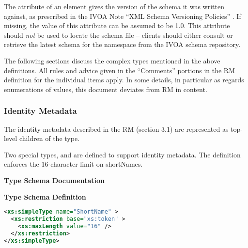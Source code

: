\documentclass[11pt,a4paper]{ivoa}
\begin{document}
The  attribute of an  element gives
the version of the schema it was written against, as prescribed in the
IVOA Note ``XML Schema Versioning Policies''
\citep{2018ivoa.spec.0529H}.  If missing, the value of this attribute
can be assumed to be 1.0.  This attribute should \emph{not} be used to
locate the schema file -- clients should either consult
 or retrieve the latest schema for the 
namespace from the IVOA schema repository.

The following sections discuss the complex types mentioned in the above
definitions.
All rules and advice given in the ``Comments'' portions in
the RM definition for the individual items
apply. In some details, in particular as regards enumerations of values,
this document deviates from RM in content.

\subsubsection{Identity Metadata}

The identity metadata described in the RM (section
3.1) are represented as top-level children of the
 type.

Two special types,  and
 are defined to support identity
metadata.  The  definition enforces the
16-character limit on shortNames.

\begin{generated}
\begingroup
        \renewcommand*\descriptionlabel[1]{%
        \hbox to 5.5em{\emph{#1}\hfil}}\vspace{2ex}\noindent\textbf{ Type Schema Documentation}




\vspace{1ex}\noindent\textbf{ Type Schema Definition}

\begin{lstlisting}[language=XML,basicstyle=\footnotesize]
<xs:simpleType name="ShortName" >
  <xs:restriction base="xs:token" >
    <xs:maxLength value="16" />
  </xs:restriction>
</xs:simpleType>
\end{lstlisting}\endgroup
\end{generated}
\end{document}
